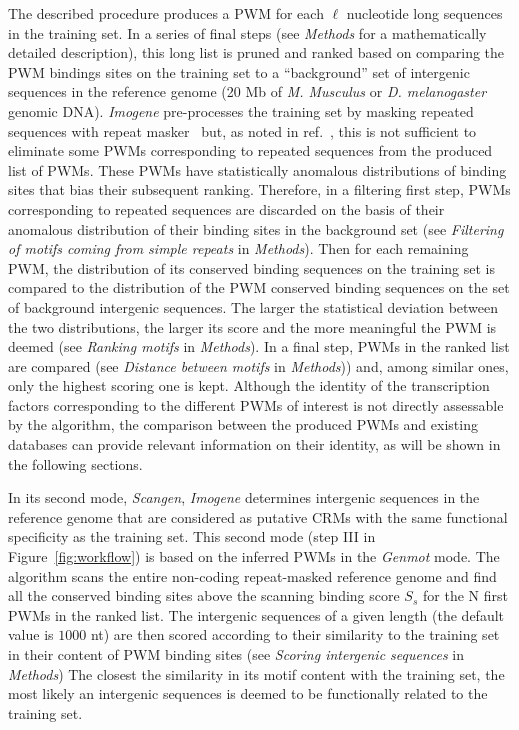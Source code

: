 \documentclass[a4,center,fleqn]{NAR}
\begin{document}
The described procedure produces a PWM for each $\ell$ nucleotide long
sequences in the training set.
In a series of final steps (see {\em Methods} for a mathematically detailed
description), this long list is pruned and ranked based on comparing the PWM
bindings sites on the training set to a ``background'' set of intergenic
sequences in the reference genome (20 Mb of {\em M. Musculus} or {\em D.
melanogaster} genomic DNA).
{\em Imogene} pre-processes the training set by masking repeated sequences with
repeat masker~\cite{bao2002automated} but, as noted in
ref.~\cite{Rouault:2010fk}, this is not sufficient to eliminate some PWMs
corresponding to repeated sequences from the produced list of PWMs. 
These PWMs have statistically anomalous distributions of binding sites that bias
their subsequent ranking.
Therefore, in a  filtering first step, PWMs corresponding to repeated sequences
are discarded on the basis of their anomalous distribution of their binding
sites in the background set (see {\em Filtering of motifs coming from simple
repeats} in {\em Methods}).
Then for each remaining  PWM, the distribution of its  conserved binding
sequences on the training set is compared to the distribution of the PWM
conserved binding sequences on the set of background intergenic sequences.
The larger the statistical deviation between the two distributions, the larger
its score and the more meaningful the PWM is deemed (see {\em Ranking motifs}
in {\em Methods}).
In a final step, PWMs in the ranked list are compared (see {\em Distance
between  motifs} in {\em Methods})) and, among similar ones, only the highest
scoring one is kept.
Although the identity of the transcription factors corresponding to the
different PWMs of interest is not directly assessable by the algorithm, the
comparison between the produced PWMs and existing databases  can provide
relevant information on their identity, as will be shown in the following
sections. 

In its second mode, {\em Scangen}, {\em Imogene} determines intergenic
sequences in the reference genome that are considered as putative CRMs with the
same functional specificity as the training set.
This second mode (step III in Figure~\ref{fig:workflow}) is  based on the
inferred PWMs in the {\em Genmot} mode.
The algorithm scans the entire non-coding repeat-masked reference genome and
find all the conserved binding sites above the scanning binding score $S_s$ for
the N first  PWMs in the ranked list.
The intergenic sequences of a given length (the default value is $1000$ nt) are
then scored according to their similarity to the training set in their content
of PWM binding sites (see {\em Scoring intergenic sequences} in {\em Methods})
The closest the similarity in its motif content with the training set, the most
likely an intergenic sequences is deemed to be functionally related to the
training set.
\end{document}
